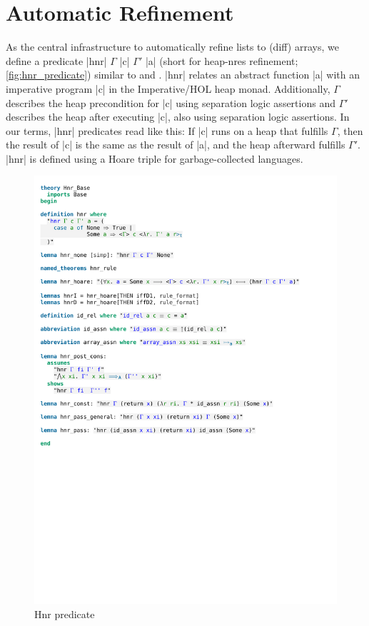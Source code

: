 \chapter{Automatic Refinement}\label{chapter:automatic-refinement}

As the central infrastructure to automatically refine lists to (diff) arrays, we define a predicate |hnr| $\Gamma$ |c| $\Gamma'$ |a| (short for heap-nres refinement; \autoref{fig:hnr_predicate}) similar to \cite[p.490]{Lammich_2017} and \cite[p.12]{Lammich_2019}. |hnr| relates an abstract function |a| with an imperative program |c| in the Imperative/HOL heap monad. Additionally, $\Gamma$ describes the heap precondition for |c| using separation logic assertions and $\Gamma'$ describes the heap after executing |c|, also using separation logic assertions. In our terms, |hnr| predicates read like this: If |c| runs on a heap that fulfills $\Gamma$, then the result of |c| is the same as the result of |a|, and the heap afterward fulfills $\Gamma'$. |hnr| is defined using a Hoare triple for garbage-collected languages.

\begin{figure}[htpb]
    \includegraphics[trim={0 24,8cm 0 2,4cm}, clip, width=1.00\textwidth]{figures/Theory_Hnr_Base.pdf}
    \caption[Hnr predicate]{Hnr predicate}
    \label{fig:hnr_predicate}
\end{figure}

